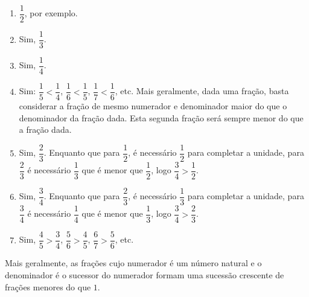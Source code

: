 \documentclass[10 pt,usenames,dvipsnames, oneside]{article}
\begin{document}
\ifdefined\prof
\begin{solucao}

\begin{enumerate} %
    \item             $\dfrac{1}{2}$, por exemplo.
    \item       Sim,       $\dfrac{1}{3}$.
    \item       Sim,       $\dfrac{1}{4}$.
    \item       Sim:       $\dfrac{1}{5} < \dfrac{1}{4}$,       $\dfrac{1}{6} <
\dfrac{1}{5}$,       $\dfrac{1}{7} < \dfrac{1}{6}$, etc. Mais geralmente, dada uma
fração, basta considerar a fração de mesmo numerador e denominador maior do que
o denominador da fração dada. Esta segunda fração será sempre menor do que a
fração dada.
    \item       Sim,       $\dfrac{2}{3}$. Enquanto que para       $\dfrac{1}{2}$,
é necessário       $\dfrac{1}{2}$       para completar a unidade, para
$\dfrac{2}{3}$       é necessário       $\dfrac{1}{3}$       que é menor que
$\dfrac{1}{2}$, logo       $\dfrac{3}{4} > \dfrac{1}{2}$.
    \item       Sim,       $\dfrac{3}{4}$. Enquanto que para       $\dfrac{2}{3}$,
é necessário       $\dfrac{1}{3}$       para completar a unidade, para
$\dfrac{3}{4}$       é necessário       $\dfrac{1}{4}$       que é menor que
$\dfrac{1}{3}$, logo       $\dfrac{3}{4} > \dfrac{2}{3}$.
    \item       Sim,       $\dfrac{4}{5} > \dfrac{3}{4}$,       $\dfrac{5}{6} >
\dfrac{4}{5}$,       $\dfrac{6}{7} > \dfrac{5}{6}$, etc.
\end{enumerate} %

  Mais geralmente, as frações cujo numerador é um número natural e o denominador
é o sucessor do numerador formam uma sucessão crescente de frações menores do
que   $1$.


\end{solucao}
\fi
\end{document}
